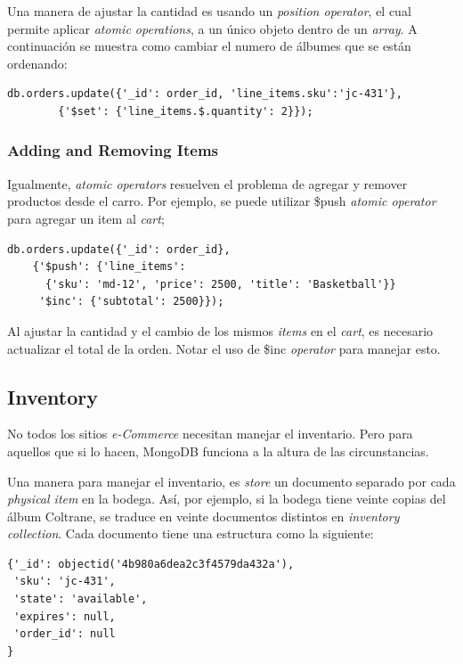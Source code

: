 Una manera de ajustar la cantidad es usando un \textit{position operator}, el cual permite aplicar \textit{atomic operations}, a un único objeto dentro de un \textit{array}. A continuación se muestra como cambiar el numero de álbumes que se están ordenando:

\begin{lstlisting}[caption= Ejemplo de \textit{atomic operation}.]
	db.orders.update({'_id': order_id, 'line_items.sku':'jc-431'},
		{'$set': {'line_items.$.quantity': 2}});
\end{lstlisting}

 
\subsubsection{Adding and Removing Items}

Igualmente, \textit{atomic operators} resuelven el problema de agregar y remover productos desde el carro. Por ejemplo, se puede utilizar \$push \textit{atomic operator} para agregar un item al \textit{cart};

\begin{lstlisting}[caption= Ejemplo de \textit{atomic operation}.]
	db.orders.update({'_id': order_id},
    {'$push': {'line_items':
      {'sku': 'md-12', 'price': 2500, 'title': 'Basketball'}}
     '$inc': {'subtotal': 2500}});
\end{lstlisting}

Al ajustar la cantidad y el cambio de los mismos \textit{items} en el \textit{cart}, es necesario actualizar el total de la orden. Notar el uso de \$inc \textit{operator} para manejar esto.

\subsection{Inventory}

No todos los sitios \textit{e-Commerce} necesitan manejar el inventario. Pero para aquellos que si lo hacen, MongoDB funciona a la altura de las circunstancias.

Una manera para manejar el inventario, es \textit{store} un documento separado por cada \textit{physical item} en la bodega. Así, por ejemplo, si la bodega tiene veinte copias del álbum Coltrane, se traduce en veinte documentos distintos en \textit{inventory collection}. Cada documento tiene una estructura como la siguiente:

\begin{lstlisting}[caption= Ejemplo de \textit{atomic operation}.]
	{'_id': objectid('4b980a6dea2c3f4579da432a'),
 'sku': 'jc-431',
 'state': 'available',
 'expires': null,
 'order_id': null
}
\end{lstlisting}


